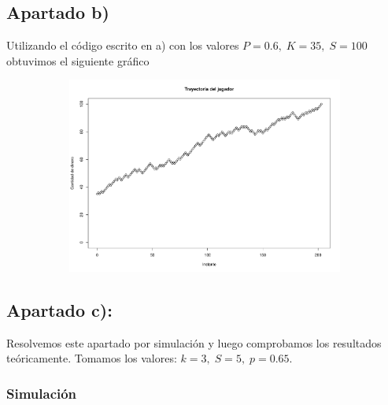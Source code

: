 \documentclass[11pt]{article}
\begin{document}

\subsection*{Apartado b)}

Utilizando el código escrito en a) con los valores $P = 0.6, \; K = 35, \; S = 100$ obtuvimos el
siguiente gráfico

\begin{figure}[h!]
  \begin{center}
    \begin{subfigure}[b]{\linewidth}
      \includegraphics[width=\linewidth]{trayectoriaGamblers.pdf}
    \end{subfigure}
  \end{center}
\end{figure}


\subsection*{Apartado c):}

Resolvemos este apartado por simulación y luego comprobamos los resultados teóricamente.
Tomamos los valores: $ k = 3, \; S = 5,\; p = 0.65 $.

\subsubsection*{Simulación}
\end{document}

